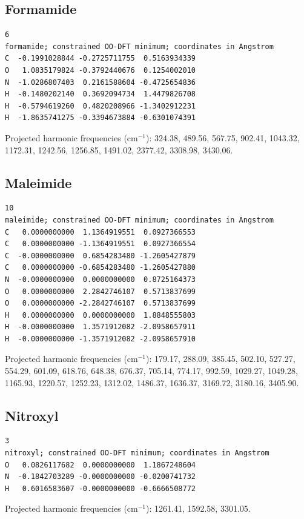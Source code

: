 \par\noindent\begin{minipage}{\linewidth}
\subsection{Formamide}
\begin{verbatim}
6
formamide; constrained OO-DFT minimum; coordinates in Angstrom
C  -0.1991028844 -0.2725711755  0.5163934339
O   1.0835179824 -0.3792440676  0.1254002010
N  -1.0286807403  0.2161588604 -0.4725654836
H  -0.1480202140  0.3692094734  1.4479826708
H  -0.5794619260  0.4820208966 -1.3402912231
H  -1.8635741275 -0.3394673884 -0.6301074391
\end{verbatim}
Projected harmonic frequencies (cm$^{-1}$): 324.38, 489.56, 567.75, 902.41, 1043.32, 1172.31, 1242.56, 1256.85, 1491.02, 2377.42, 3308.98, 3430.06.

\end{minipage}\par\medskip
\par\noindent\begin{minipage}{\linewidth}
\subsection{Maleimide}
\begin{verbatim}
10
maleimide; constrained OO-DFT minimum; coordinates in Angstrom
C   0.0000000000  1.1364919551  0.0927366553
C   0.0000000000 -1.1364919551  0.0927366554
C  -0.0000000000  0.6854283480 -1.2605427879
C   0.0000000000 -0.6854283480 -1.2605427880
N  -0.0000000000  0.0000000000  0.8725164373
O   0.0000000000  2.2842746107  0.5713837699
O   0.0000000000 -2.2842746107  0.5713837699
H   0.0000000000  0.0000000000  1.8848555803
H  -0.0000000000  1.3571912082 -2.0958657911
H  -0.0000000000 -1.3571912082 -2.0958657910
\end{verbatim}
Projected harmonic frequencies (cm$^{-1}$): 179.17, 288.09, 385.45, 502.10, 527.27, 554.29, 601.09, 618.76, 648.38, 676.37, 705.14, 774.17, 992.59, 1029.27, 1049.28, 1165.93, 1220.57, 1252.23, 1312.02, 1486.37, 1636.37, 3169.72, 3180.16, 3405.90.

\end{minipage}\par\medskip
\par\noindent\begin{minipage}{\linewidth}
\subsection{Nitroxyl}
\begin{verbatim}
3
nitroxyl; constrained OO-DFT minimum; coordinates in Angstrom
O   0.0826117682  0.0000000000  1.1867248604
N  -0.1842703289 -0.0000000000 -0.0200741732
H   0.6016583607 -0.0000000000 -0.6666508772
\end{verbatim}
Projected harmonic frequencies (cm$^{-1}$): 1261.41, 1592.58, 3301.05.

\end{minipage}\par\medskip